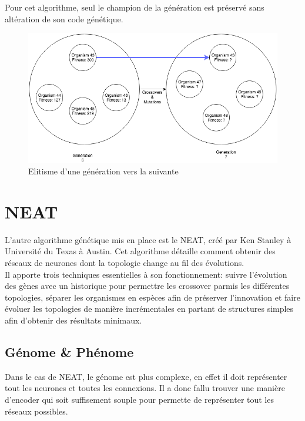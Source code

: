 \documentclass{article}
\begin{document}
Pour cet algorithme, seul le champion de la génération est préservé sans altération de son code génétique.

\begin{figure}[h]
\begin{center}
	\includegraphics[scale=0.5]{elitism.png}
	\caption{Elitisme d'une génération vers la suivante}
\end{center}
\end{figure}
\newpage

\section{NEAT}

L'autre algorithme génétique mis en place est le NEAT, créé par Ken Stanley à Université du Texas à Austin. Cet algorithme détaille comment obtenir des réseaux de neurones dont la topologie change au fil des évolutions.\\
Il apporte trois techniques essentielles à son fonctionnement: suivre l'évolution des gènes avec un historique pour permettre les crossover parmis les différentes topologies, séparer les organismes en espèces afin de préserver l'innovation et faire évoluer les topologies de manière incrémentales en partant de structures simples afin d'obtenir des résultats minimaux.\cite{wikineat}

\subsection{Génome \& Phénome}

Dans le cas de NEAT, le génome est plus complexe, en effet il doit représenter tout les neurones et toutes les connexions. Il a donc fallu trouver une manière d'encoder qui soit suffisement souple pour permette de représenter tout les réseaux possibles.
\end{document}
